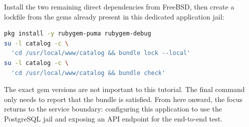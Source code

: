 Install the two remaining direct dependencies from FreeBSD, then create a
lockfile from the gems already present in this dedicated application jail:

\begin{lstlisting}[language=sh]
pkg install -y rubygem-puma rubygem-debug
su -l catalog -c \
  'cd /usr/local/www/catalog && bundle lock --local'
su -l catalog -c \
  'cd /usr/local/www/catalog && bundle check'
\end{lstlisting}

The exact gem versions are not important to this tutorial. The final command
only needs to report that the bundle is satisfied. From here onward, the focus
returns to the service boundary: configuring this application to use the
PostgreSQL jail and exposing an API endpoint for the end-to-end test.

